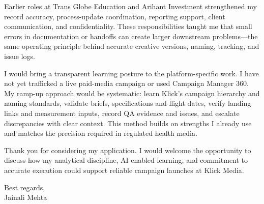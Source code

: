 \documentclass[letterpaper,11pt]{article}
\begin{document}
\bigbreak
Earlier roles at Trans Globe Education and Arihant Investment strengthened my record accuracy, process-update coordination, reporting support, client communication, and confidentiality. These responsibilities taught me that small errors in documentation or handoffs can create larger downstream problems---the same operating principle behind accurate creative versions, naming, tracking, and issue logs.

\bigbreak
I would bring a transparent learning posture to the platform-specific work. I have not yet trafficked a live paid-media campaign or used Campaign Manager 360. My ramp-up approach would be systematic: learn Klick's campaign hierarchy and naming standards, validate briefs, specifications and flight dates, verify landing links and measurement inputs, record QA evidence and issues, and escalate discrepancies with clear context. This method builds on strengths I already use and matches the precision required in regulated health media.

\bigbreak
Thank you for considering my application. I would welcome the opportunity to discuss how my analytical discipline, AI-enabled learning, and commitment to accurate execution could support reliable campaign launches at Klick Media.

\bigbreak
Best regards,\\
Jainali Mehta
\end{document}
